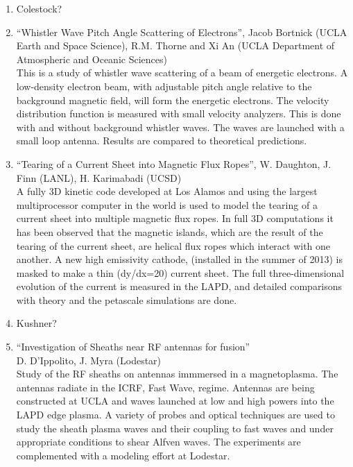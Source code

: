\documentclass[11pt]{article}
\begin{document}
\begin{enumerate}
\item Colestock?

\item ``Whistler Wave Pitch Angle Scattering of Electrons'', Jacob
  Bortnick (UCLA Earth and Space Science), R.M. Thorne and Xi An (UCLA
  Department of Atmospheric and Oceanic Sciences)\\ This is a study of
  whistler wave scattering of a beam of energetic electrons. A
  low-density electron beam, with adjustable pitch angle relative to
  the background magnetic field, will form the energetic
  electrons. The velocity distribution function is measured with
  small velocity analyzers. This is done with and without
  background whistler waves. The waves are launched with a small
  loop antenna. Results are compared to theoretical predictions.

\item ``Tearing of a Current Sheet into Magnetic Flux Ropes'',
  W. Daughton, J. Finn (LANL), H. Karimabadi (UCSD)\\ A fully 3D
  kinetic code developed at Los Alamos and using the largest
  multiprocessor computer in the world is used to model the
  tearing of a current sheet into multiple magnetic flux ropes. In
  full 3D computations it has been observed that the magnetic islands,
  which are the result of the tearing of the current sheet, are helical
  flux ropes which interact with one another. A new high emissivity
  cathode, (installed in the summer of 2013) is masked to
  make a thin (dy/dx=20) current sheet. The full three-dimensional
  evolution of the current is measured in the LAPD, and detailed
  comparisons with theory and the petascale simulations are done.


\item Kushner?


\item ``Investigation of Sheaths near RF antennas for fusion''\\ D.
  D'Ippolito, J. Myra (Lodestar)\\ Study of the RF sheaths on antennas
  immmersed in a magnetoplasma. The antennas radiate in the ICRF, Fast
  Wave, regime. Antennas are being constructed at UCLA and waves
  launched at low and high powers into the LAPD edge plasma. A variety
  of probes and optical techniques are used to study the sheath
  plasma waves and their coupling to fast waves and under appropriate
  conditions to shear Alfven waves. The experiments are
  complemented with a modeling effort at Lodestar.\\


\end{enumerate}
\end{document}
